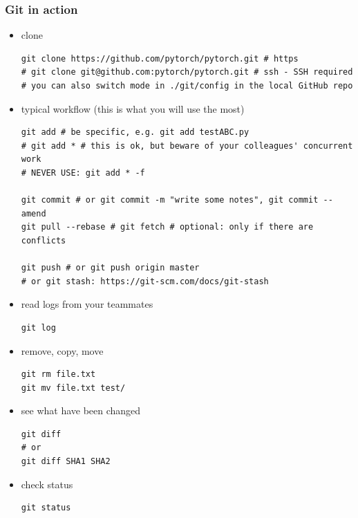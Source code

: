 \documentclass{beamer}
\begin{document}
\begin{frame}[fragile]
\frametitle{Git in action}

\begin{itemize}

\item clone
\tiny
\begin{verbatim}
git clone https://github.com/pytorch/pytorch.git # https
# git clone git@github.com:pytorch/pytorch.git # ssh - SSH required 
# you can also switch mode in ./git/config in the local GitHub repo
\end{verbatim}
\normalsize



\item typical workflow (this is what you will use the most)
\tiny
\begin{verbatim}
git add # be specific, e.g. git add testABC.py
# git add * # this is ok, but beware of your colleagues' concurrent work
# NEVER USE: git add * -f

git commit # or git commit -m "write some notes", git commit --amend
git pull --rebase # git fetch # optional: only if there are conflicts

git push # or git push origin master
# or git stash: https://git-scm.com/docs/git-stash
\end{verbatim}
\normalsize

\item read logs from your teammates
\tiny
\begin{verbatim}
git log
\end{verbatim}
\normalsize

\item remove, copy, move
\tiny
\begin{verbatim}
git rm file.txt
git mv file.txt test/
\end{verbatim}
\normalsize

\item see what have been changed
\tiny
\begin{verbatim}
git diff 
# or 
git diff SHA1 SHA2
\end{verbatim}
\normalsize


\item check status
\tiny
\begin{verbatim}
git status
\end{verbatim}
\normalsize


\end{itemize}
\end{frame}
\end{document}
